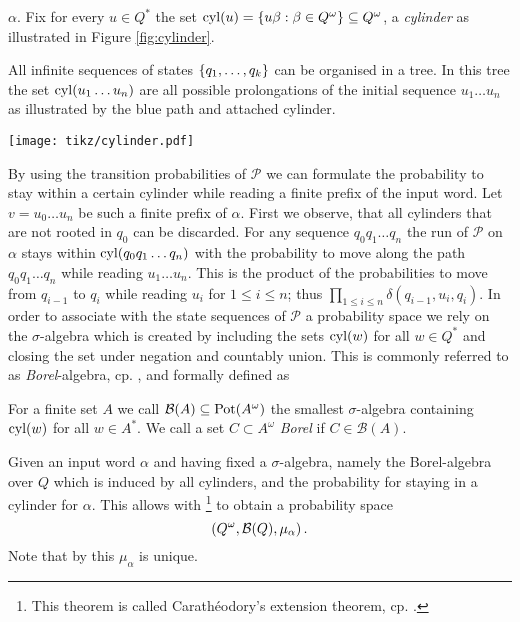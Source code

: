 $\alpha$. Fix for every $u\in Q^{*}$ the set 
$\operatorname{cyl}(u) = \left\{u\beta : \beta\in Q^{\omega}\right\}\subseteq Q^{\omega}$, a 
\emph{cylinder} as illustrated in Figure \ref{fig:cylinder}.
\begin{drawing}
  \caption{All infinite sequences of states $\left\{q_{1},\dots, q_{k}\right\}$ can be
  organised in a tree. In this tree the set $\operatorname{cyl}(u_{1}\dots u_{n})$ are all 
  possible prolongations of the initial sequence $u_{1}\dots u_{n}$ as 
  illustrated by the blue path and attached cylinder.}
  \label{fig:cylinder}
  \begin{center}
    \texttt{[image: tikz/cylinder.pdf]}
  \end{center}
\end{drawing}
By using the transition probabilities of $\mathcal{P}$ we can formulate the 
probability to stay within a certain cylinder while reading a finite prefix of 
the input word. Let $v = u_{0}\dots u_{n}$ be such a finite prefix of $\alpha$.
First we observe, that all cylinders that are not rooted in $q_{0}$ can be 
discarded. For any sequence $q_{0}q_{1}\dots q_{n}$ the run of $\mathcal{P}$
on $\alpha$ stays within $\operatorname{cyl}(q_{0}q_{1}\dots q_{n})$ with the probability to
move along the path $q_{0}q_{1}\dots q_{n}$ while reading $u_{1}\dots u_{n}$.
This is the product of the probabilities to move from $q_{i-1}$ to $q_{i}$
while reading $u_{i}$ for $1\leq i\leq n$; thus 
$\prod_{1\leq i\leq n}\delta(q_{i-1},u_{i},q_{i})$. In order to associate with
the state sequences of $\mathcal{P}$ a probability space we rely on the 
$\sigma$-algebra which is created by including the sets $\operatorname{cyl}(w)$ for all 
$w\in Q^{*}$ and closing the set under negation and countably union. This is
commonly referred to as \emph{Borel}-algebra, cp. \cite{}, and formally 
defined as
\begin{definition}
  For a finite set $A$ we call $\mathcal{B}(A)\subseteq\operatorname{Pot}(A^{\omega})$ the 
  smallest $\sigma$-algebra containing $\operatorname{cyl}(w)$ for all $w\in A^{*}$. We call
  a set $C\subset A^{\omega}$ \emph{Borel} if $C\in\mathcal{B}(A)$.
\end{definition}
Given an input word $\alpha$ and having fixed a $\sigma$-algebra, namely the
Borel-algebra over $Q$ which is induced by all cylinders, and the probability 
for staying in a cylinder for $\alpha$. This allows with 
\cite[Theorem 5.6]{Bauer}\footnote{This theorem is called Carath\'{e}odory's
extension theorem, cp. \cite[Chapter 2.3.]{RandAutoInfTrees}.} to obtain a 
probability space
\begin{equation*}
  \left(Q^{\omega}, \mathcal{B}(Q), \mu_{\alpha}\right).
\end{equation*}
Note that by \cite[Theorem 5.4]{Bauer} this $\mu_{\alpha}$ is unique.

